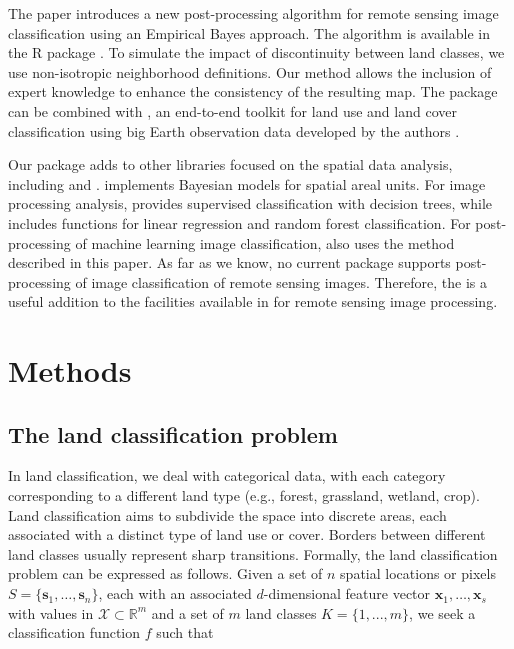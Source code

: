 \documentclass[
  shortnames]{jss}
\begin{document}
The paper introduces a new post-processing algorithm for remote sensing image classification using an Empirical Bayes approach. The algorithm is available in the R package . To simulate the impact of discontinuity between land classes, we use non-isotropic neighborhood definitions. Our method allows the inclusion of expert knowledge to enhance the consistency of the resulting map. The  package can be combined with , an end-to-end toolkit for land use and land cover classification using big Earth observation data developed by the authors \citep{Simoes2021}.

Our package adds to other  libraries focused on the spatial data analysis, including  \citep{Bivand2023} and  \citep{Li2022}.  \citep{Lee2013} implements Bayesian models for spatial areal units. For image processing analysis,  \citep{Hijmans2023} provides supervised classification with decision trees, while  \citep{Bivand2023} includes functions for linear regression and random forest classification. For post-processing of machine learning image classification,  also uses the method described in this paper. As far as we know, no current  package supports post-processing of image classification of remote sensing images. Therefore, the  is a useful addition to the facilities available in  for remote sensing image processing.

\newpage

\hypertarget{methods}{%
\section{Methods}\label{methods}}

\hypertarget{the-land-classification-problem}{%
\subsection{The land classification problem}\label{the-land-classification-problem}}

In land classification, we deal with categorical data, with each category corresponding to a different land type (e.g., forest, grassland, wetland, crop). Land classification aims to subdivide the space into discrete areas, each associated with a distinct type of land use or cover. Borders between different land classes usually represent sharp transitions. Formally, the land classification problem can be expressed as follows. Given a set of \(n\) spatial locations or pixels \(S = \{ \mathbf{s}_1, \ldots, \mathbf{s}_n \}\), each with an associated \(d\)-dimensional feature vector \(\mathbf{x}_1, \ldots, \mathbf{x}_s\) with values in \(\mathcal{X} \subset \mathbb{R}^m\) and a set of \(m\) land classes \(K = \{ 1, ..., m \}\), we seek a classification function \(f\) such that
\end{document}
